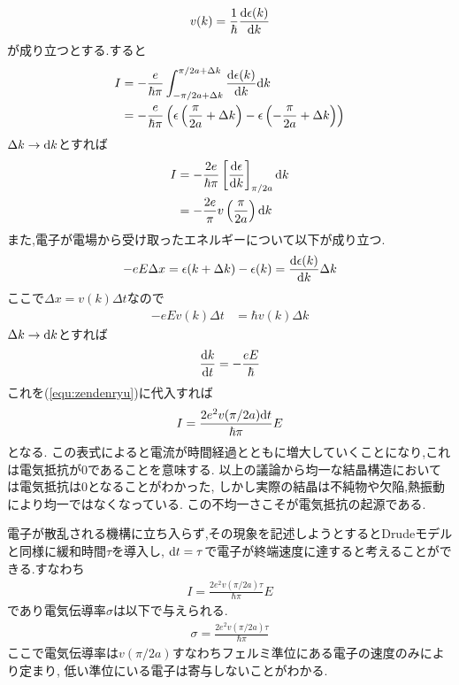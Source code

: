 \begin{align}
  v(k)=\frac{1}{\hbar}\frac{{\rm d}\epsilon(k)}{{\rm d}k}
\end{align}
が成り立つとする.すると
\begin{align}
  \begin{split}
    I&=-\frac{e}{\hbar\pi}\int_{-\pi/2a+\Delta k}^{\pi/2a+\Delta k}\frac{{\rm d}\epsilon(k)}{{\rm d}k}{\rm d}k\\
    &=-\frac{e}{\hbar\pi}\left(\epsilon\left(\frac{\pi}{2a}+\Delta k\right)-\epsilon\left(-\frac{\pi}{2a}+\Delta k\right)\right)
  \end{split}
\end{align}
$\Delta k\rightarrow{\rm d}k$とすれば
\begin{align}
  \begin{split}
    \label{equ:zendenryu}
    I&=-\frac{2e}{\hbar\pi}\left[\frac{{\rm d}\epsilon}{{\rm d}k}\right]_{\pi/2a}{\rm d}k\\
    &=-\frac{2e}{\pi}v\left(\frac{\pi}{2a}\right){\rm d}k
  \end{split}
\end{align}
また,電子が電場から受け取ったエネルギーについて以下が成り立つ.
\begin{align}
  -eE\Delta x=\epsilon(k+\Delta k)-\epsilon(k)=\frac{{\rm d}\epsilon(k)}{{\rm d}k}\Delta k
\end{align}
ここで$\Delta x=v(k)\Delta t$なので
\begin{align}
    -eEv(k)\Delta t&=\hbar v(k)\Delta k
\end{align}
$\Delta k\rightarrow {\rm d}k$とすれば
\begin{align}
  \frac{{\rm d}k}{{\rm d}t}=-\frac{eE}{\hbar}
\end{align}
これを(\ref{equ:zendenryu})に代入すれば
\begin{align}
  I=\frac{2e^2v(\pi/2a){\rm d}t}{\hbar\pi}E
\end{align}
となる.
この表式によると電流が時間経過とともに増大していくことになり,これは電気抵抗が$0$であることを意味する.
以上の議論から均一な結晶構造においては電気抵抗は$0$となることがわかった,
しかし実際の結晶は不純物や欠陥,熱振動により均一ではなくなっている.
この不均一さこそが電気抵抗の起源である.

電子が散乱される機構に立ち入らず,その現象を記述しようとするとDrudeモデルと同様に緩和時間$\tau$を導入し,
${\rm d}t=\tau$で電子が終端速度に達すると考えることができる.すなわち
\begin{align}
  I=\frac{2e^2v(\pi/2a)\tau}{\hbar\pi}E
\end{align}
であり電気伝導率$\sigma$は以下で与えられる.
\begin{align}
  \sigma=\frac{2e^2v(\pi/2a)\tau}{\hbar\pi}
\end{align}
ここで電気伝導率は$v(\pi/2a)$すなわちフェルミ準位にある電子の速度のみにより定まり,
低い準位にいる電子は寄与しないことがわかる.
